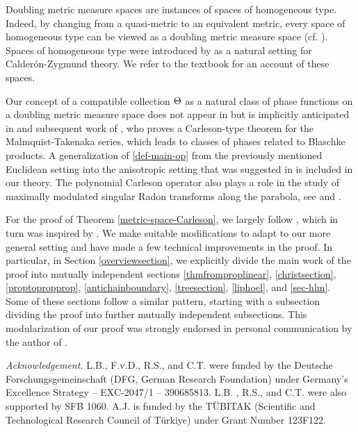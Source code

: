 Doubling metric measure spaces are instances of spaces of homogeneous type. Indeed, by changing from a quasi-metric to an equivalent metric, every space of homogeneous type can be viewed as a doubling metric measure space (cf. \cite{MaciasSegovia}). Spaces of homogeneous type were introduced by \cite{MR0499948} as a natural setting for Calderón-Zygmund theory. We refer to the textbook \cite{stein-book} for an account of these spaces.

Our concept of a compatible collection ${\Theta}$ as a natural class of phase functions on a doubling metric measure space does not appear in \cite{stein-book} but is implicitly anticipated in \cite{zk-polynomial} and subsequent work of \cite{mnatsakanyan}, who proves a Carleson-type theorem for the Malmquist-Takenaka series, which leads to classes of phases related to Blaschke products. A generalization of \eqref{def-main-op} from the previously mentioned Euclidean setting into the anisotropic setting that was suggested in \cite{zk-polynomial} is included in our theory. The polynomial Carleson operator also plays a role in the study of maximally modulated singular Radon transforms along the parabola, see \cite{ramos} and \cite{becker2024maximal}.

For the proof of Theorem \ref{metric-space-Carleson}, we largely follow \cite{zk-polynomial}, which in turn was inspired by \cite{lie-polynomial}. We make suitable modifications to adapt to our more general setting and have made a few technical improvements in the proof. In particular, in Section \ref{overviewsection}, we explicitly divide the main work of the proof into mutually independent sections \ref{thmfromproplinear}, \ref{christsection}, \ref{proptopropprop}, \ref{antichainboundary}, \ref{treesection}, \ref{liphoel}, and \ref{sec-hlm}. Some of these sections follow a similar pattern, starting with a subsection dividing the proof into further mutually independent subsections. This modularization of our proof was strongly endorsed in personal communication by the author of \cite{zk-polynomial}.











\noindent \textit{Acknowledgement.}
L.B., F.v.D., R.S., and C.T. were funded by the Deutsche Forschungsgemeinschaft (DFG, German Research Foundation) under Germany's Excellence Strategy -- EXC-2047/1 -- 390685813.
L.B. , R.S., and C.T. were also supported by SFB 1060.
A.J. is funded by the T\"UBITAK (Scientific and Technological Research Council of T\"urkiye) under Grant Number 123F122.

